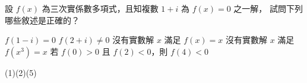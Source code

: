 \begin{QUESTIONS}
\begin{QUESTION}
        \begin{ExamAnsRateInfo}{29}{55}{23}{9}
        \end{ExamAnsRateInfo}
        \begin{QBODY}
            設 $f(x)$ 為三次實係數多項式，且知複數 $1+i$ 為 $f(x)=0$ 之一解，
            試問下列哪些敘述是正確的？
            \begin{QOPS} 
                \QOP $f(1-i)=0$ \quad 
                \QOP $f(2+i) \neq 0$ 
                \QOP 沒有實數解 $x$ 滿足 $f(x)=x$ 
                \QOP 沒有實數解 $x$ 滿足 $f(x^3)=x$ 
                \QOP 若 $f(0)>0$ 且 $f(2) <0$，則 $f(4)<0$ 
            \end{QOPS}
        \end{QBODY}
        \begin{QFROMS}
        \end{QFROMS}
        \begin{QTAGS}\end{QTAGS}
        \begin{QANS}
            (1)(2)(5)
        \end{QANS}
        \begin{QSOLLIST}
        \end{QSOLLIST}
        \begin{QEMPTYSPACE}
        \end{QEMPTYSPACE}
    \end{QUESTION}
\end{QUESTIONS}
